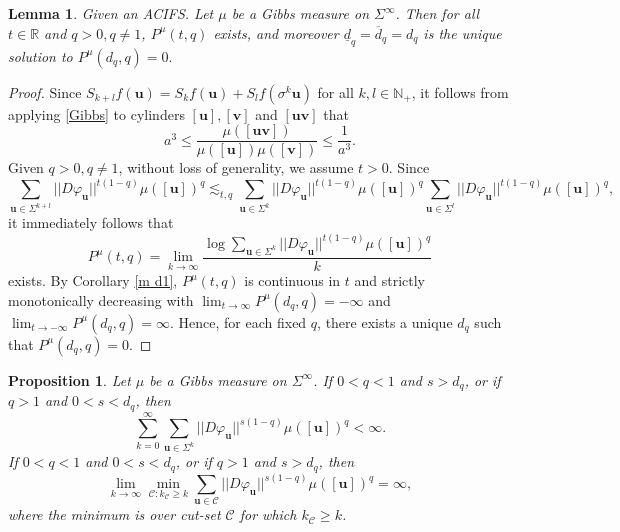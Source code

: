 \documentclass[12pt]{amsart}
\theoremstyle{plain}
\newtheorem{lem}[thm]{Lemma}
\newtheorem{prop}[thm]{Proposition}
\theoremstyle{definition}
\theoremstyle{remark}
\newcommand{\bu}{\mathbf{u}}
\newcommand{\bv}{\mathbf{v}}
\begin{document}
\begin{lem}\label{lem_Adq}
Given an ACIFS. Let $\mu$ be a Gibbs measure on $\Sigma^\infty$. Then for all $t\in \mathbb{R}$ and $q>0, q\not=1$,  $P^\mu(t, q)$ exists, and moreover $\underline{d}_q=\overline{d}_q=d_q$ is the unique  solution to $P^\mu(d_q, q)=0.$
\end{lem}

\begin{proof}
Since  $S_{k+l}f(\mathbf{u})=S_{k}f(\mathbf{u})+S_{l}f(\sigma^k\mathbf{u}) $   for all $k, l\in\mathbb{N}_+$,  
 it follows from applying \eqref{Gibbs} to cylinders $[\bu], [\bv]$  and $[\bu\bv]$ that
$$
a^3\le\frac{\mu([\bu\bv])}{\mu([\bu])\mu([\bv])}\le\frac{1}{a^3}.
$$
Given $q>0, q\not=1$,  without loss of generality, we assume  $t>0$. Since 
$$
\sum_{\mathbf{u}\in\Sigma^{k+l}}||D\varphi_\mathbf{u}||^{t(1-q)}\mu([\bu])^q\lesssim_{t,q}  \sum_{\mathbf{u}\in\Sigma^k}||D\varphi_\mathbf{u}||^{t(1-q)}\mu([\bu])^q   \sum_{\mathbf{u}\in\Sigma^l}||D\varphi_\mathbf{u}||^{t(1-q)}\mu([\bu])^q, 
$$
it immediately follows that 
$$
P^\mu(t, q)= \lim_{k\to\infty}\frac{\log  \sum_{\mathbf{u}\in\Sigma^k}||D\varphi_\mathbf{u}||^{t(1-q)}\mu([\bu])^q}{k}
$$
exists.  
By Corollary \ref{m d1},  $P^\mu(t, q)$ is continuous in $t$ and  strictly monotonically decreasing with  $\lim_{t\to\infty}P^\mu(d_q, q)=-\infty$ and $\lim_{t\to-\infty}P^\mu(d_q, q)=\infty$. Hence, for each fixed $q$, there exists a unique $d_q$ such that $P^\mu(d_q, q)=0.$            
\end{proof}

\begin{prop}\label{prop_lme}
Let $\mu$ be a Gibbs measure on $\Sigma^\infty$. If  $0<q<1$ and $s>d_q$, or if $q>1$ and $0<s<d_q$, then
$$
\sum_{k=0}^\infty\sum_{\mathbf{u}\in \Sigma^k}||D\varphi_\mathbf{u}||^{s(1-q)}\mu([\mathbf{u}])^q<\infty.
$$
If $0<q<1$ and $0<s<d_q$, or if $q>1$ and $s>d_q$, then
$$
\lim_{k\to\infty}\min_{\mathcal{C}:k_\mathcal{C}\ge k}\sum_{\mathbf{u}\in\mathcal{C}}||D\varphi_\mathbf{u}||^{s(1-q)}\mu([\mathbf{u}])^q=\infty,
$$
where the minimum is over cut-set $\mathcal{C}$ for which $k_\mathcal{C}\ge k$.
\end{prop}
\end{document}
